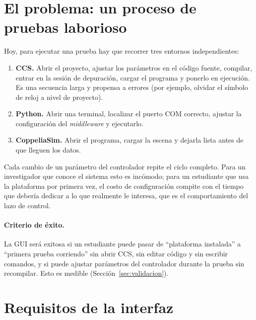 \documentclass[12pt,letterpaper]{article}
\begin{document}
\section{El problema: un proceso de pruebas laborioso}
\label{sec:problema}

Hoy, para ejecutar una prueba hay que recorrer tres entornos independientes:
\begin{enumerate}
    \item \textbf{CCS.} Abrir el proyecto, ajustar los parámetros en el código fuente, compilar, entrar en la sesión de depuración, cargar el programa y ponerlo en ejecución. Es una secuencia larga y propensa a errores (por ejemplo, olvidar el símbolo de reloj a nivel de proyecto).
    \item \textbf{Python.} Abrir una terminal, localizar el puerto COM correcto, ajustar la configuración del \textit{middleware} y ejecutarlo.
    \item \textbf{CoppeliaSim.} Abrir el programa, cargar la escena y dejarla lista antes de que lleguen los datos.
\end{enumerate}
Cada cambio de un parámetro del controlador repite el ciclo completo. Para un investigador que conoce el sistema esto es incómodo; para un estudiante que usa la plataforma por primera vez, el costo de configuración compite con el tiempo que debería dedicar a lo que realmente le interesa, que es el comportamiento del lazo de control.

\paragraph{Criterio de éxito.} La GUI será exitosa si un estudiante puede pasar de ``plataforma instalada'' a ``primera prueba corriendo'' sin abrir CCS, sin editar código y sin escribir comandos, y si puede ajustar parámetros del controlador durante la prueba sin recompilar. Esto es medible (Sección~\ref{sec:validacion}).

\section{Requisitos de la interfaz}
\label{sec:requisitos}
\end{document}
